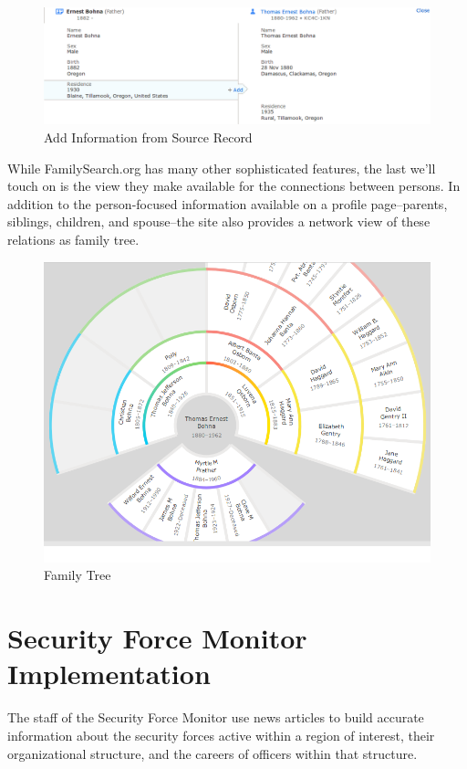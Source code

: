 \documentclass[format=siggraph, review=true]{acmart}
\begin{document}
\begin{figure}[h]
\includegraphics[width=\columnwidth]{images/familysearch/add_info.png}
\caption{Add Information from Source Record}
\label{fig:source-linker}
\end{figure}

While FamilySearch.org has many other sophisticated features, the last
we'll touch on is the view they make available for the connections
between persons. In addition to the person-focused information available
on a profile page--parents, siblings, children, and
spouse--the site also provides a network view of these relations as
family tree.

\begin{figure}[h]
\includegraphics[width=\columnwidth]{images/familysearch/family_tree.png}
\caption{Family Tree}
\label{fig:source-linker}
\end{figure}

\section*{Security Force Monitor Implementation}
The staff of the Security Force Monitor use news articles to build
accurate information about the security forces active within a region
of interest, their organizational structure, and the careers of
officers within that structure.
\end{document}
